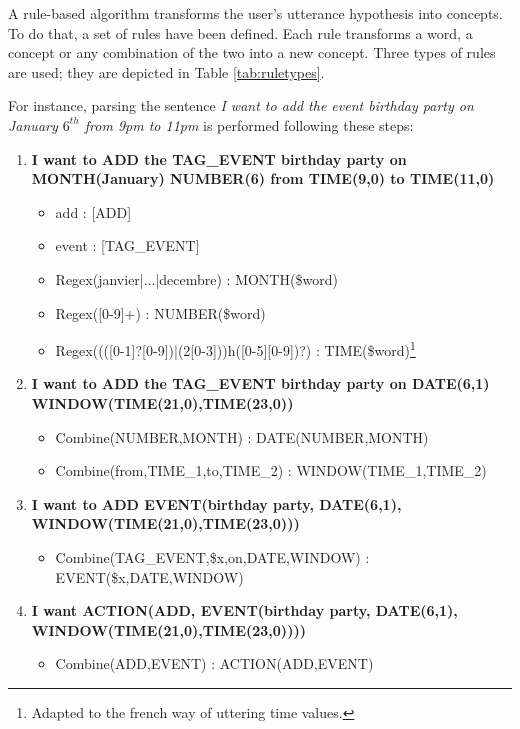 			A rule-based algorithm transforms the user's utterance hypothesis into concepts. To do that, a set of rules have been defined. Each rule transforms a word, a concept or any combination of the two into a new concept. Three types of rules are used; they are depicted in Table \ref{tab:ruletypes}.
			
			For instance, parsing the sentence \textit{I want to add the event birthday party on January $6^{th}$ from 9pm to 11pm} is performed following these steps:
							
							\begin{enumerate}
						\item \textbf{I want to ADD the TAG\_EVENT birthday party on MONTH(January) NUMBER(6) from TIME(9,0) to TIME(11,0)}
								\begin{itemize}
										\item add : [ADD]
											\item event : [TAG\_EVENT]
											\item Regex(janvier|...|decembre) : MONTH(\$word)
											\item Regex([0-9]+) : NUMBER(\$word)
											\item Regex((([0-1]?[0-9])|(2[0-3]))h([0-5][0-9])?) : TIME(\$word)\footnote{Adapted to the french way of uttering time values.}
									\end{itemize}
							\item \textbf{I want to ADD the TAG\_EVENT birthday party on DATE(6,1) \\ WINDOW(TIME(21,0),TIME(23,0))}
								\begin{itemize}
										\item Combine(NUMBER,MONTH) : DATE(NUMBER,MONTH)
											\item Combine(from,TIME\_1,to,TIME\_2) : WINDOW(TIME\_1,TIME\_2)
									\end{itemize}
							\item \textbf{I want to ADD EVENT(birthday party, DATE(6,1), \\ WINDOW(TIME(21,0),TIME(23,0)))}
								\begin{itemize}
										\item Combine(TAG\_EVENT,\$x,on,DATE,WINDOW) : EVENT(\$x,DATE,WINDOW)
									\end{itemize}
							\item \textbf{I want ACTION(ADD, EVENT(birthday party, DATE(6,1), \\ WINDOW(TIME(21,0),TIME(23,0))))}
								\begin{itemize}
										\item Combine(ADD,EVENT) : ACTION(ADD,EVENT)
									\end{itemize}
					\end{enumerate}
					
